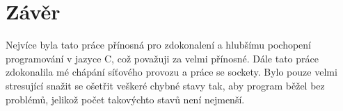 \documentclass[12pt]{article}
\begin{document}
\newpage
\section{Závěr}
Nejvíce byla tato práce přínosná pro zdokonalení a hlubšímu pochopení programování v jazyce C, což považuji za velmi přínosné. Dále tato práce zdokonalila mé chápání síťového provozu a práce se sockety. Bylo pouze velmi stresující snažit se ošetřit veškeré chybné stavy tak, aby program běžel bez problémů, jelikož počet takovýchto stavů není nejmenší. 
\end{document}
